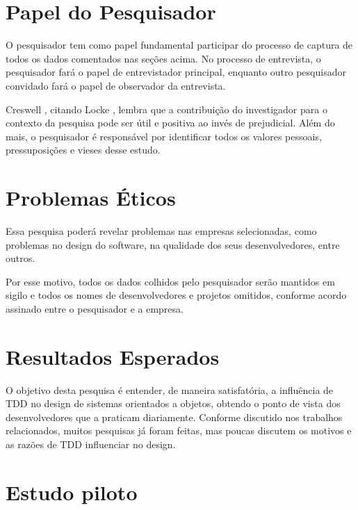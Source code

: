 \section{Papel do Pesquisador}
\label{sec:planejamento-papel}

O pesquisador tem como papel fundamental participar do processo de  captura de
todos os dados comentados nas seções acima. No processo de entrevista, o 
pesquisador fará o papel de entrevistador principal, enquanto outro  pesquisador
convidado fará o papel de observador da entrevista.

Creswell \cite{creswell}, citando Locke \cite{locke}, lembra
que a contribuição do investigador para o contexto da pesquisa pode ser útil e
positiva ao invés de prejudicial. Além do mais, o pesquisador é responsável por
identificar todos os valores pessoais, pressuposições e vieses desse estudo.

\section{Problemas Éticos}
\label{sec:planejamento-etica}

Essa pesquisa poderá revelar problemas nas empresas selecionadas, como problemas
no design do software, na qualidade dos seus desenvolvedores, entre outros. 

Por esse motivo, todos os dados colhidos pelo pesquisador serão mantidos em
sigilo e todos os nomes de desenvolvedores e projetos omitidos, conforme acordo 
assinado entre o pesquisador e a empresa.

\section{Resultados Esperados}
\label{sec:planejamento-resultados-esperados}

O objetivo desta pesquisa é entender, de maneira satisfatória, a influência de 
TDD no design de sistemas orientados a objetos, obtendo o ponto de vista dos 
desenvolvedores que a praticam diariamente. Conforme discutido nos trabalhos 
relacionados, muitos pesquisas já foram feitas, mas poucas discutem os motivos 
e as razões de TDD influenciar no design.

\section{Estudo piloto}


